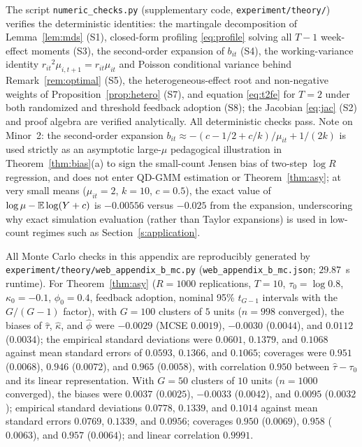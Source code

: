 The script \texttt{numeric\_checks.py} (supplementary code, \texttt{experiment/theory/}) verifies the
deterministic identities: the martingale decomposition of Lemma~\ref{lem:mds} (S1), closed-form profiling \eqref{eq:profile}
solving all $T-1$ week-effect moments (S3), the second-order expansion of $b_{it}$ (S4), the working-variance identity $r_{it}{}^2\mu_{i,t+1}=r_{it}\mu_{it}$
and Poisson conditional variance behind Remark~\ref{rem:optimal} (S5), the heterogeneous-effect root and non-negative weights of
Proposition~\ref{prop:hetero} (S7), and equation \eqref{eq:t2fe} for $T=2$ under both randomized and threshold feedback adoption (S8); the Jacobian
\eqref{eq:jac} (S2) and proof algebra are verified analytically. All deterministic checks pass. Note on Minor~2: the second-order
expansion $b_{it}\approx -(c-1/2+c/k)/\mu_{it}+1/(2k)$ is used strictly as an asymptotic large-$\mu$ pedagogical illustration in
Theorem~\ref{thm:bias}(a) to sign the small-count Jensen bias of two-step $\log R$ regression, and does not enter QD-GMM estimation or Theorem~\ref{thm:asy}; at very small means ($\mu_{it}=2$, $k=10$, $c=0.5$), the exact value of $\log\mu-\mathbb{E}\log(Y+c)$ is $-0.00556$ versus $-0.025$ from the expansion, underscoring why exact simulation evaluation (rather than Taylor expansions) is used in low-count regimes such as Section~\ref{s:application}.

All Monte Carlo checks in this appendix are reproducibly generated by \texttt{experiment/theory/web\_appendix\_b\_mc.py}
(\texttt{web\_appendix\_b\_mc.json}; $29.87$~s runtime). For Theorem~\ref{thm:asy} ($R=1000$ replications, $T=10$,
$\tau_0=\log0.8$, $\kappa_0=-0.1$, $\phi_0=0.4$, feedback adoption, nominal 95\% $t_{G-1}$
intervals with the $G/(G-1)$ factor), with $G=100$ clusters of $5$ units ($n=998$ converged), the biases of $\hat\tau$,
$\hat\kappa$, and $\hat\phi$ were $-0.0029$ (MCSE $0.0019$), $-0.0030$ ($0.0044$), and $0.0112$ ($0.0034$); the
empirical standard deviations were $0.0601$, $0.1379$, and $0.1068$ against mean standard errors of
$0.0593$, $0.1366$, and $0.1065$; coverages were $0.951$ ($0.0068$), $0.946$ ($0.0072$), and $0.965$ ($0.0058$),
with correlation $0.950$ between $\hat\tau-\tau_0$ and its linear representation. With $G=50$ clusters of $10$ units
($n=1000$ converged), the biases were $0.0037$ ($0.0025$), $-0.0033$ ($0.0042$), and $0.0095$ ($0.0032$); empirical
standard deviations $0.0778$, $0.1339$, and $0.1014$ against mean standard errors $0.0769$, $0.1339$, and $0.0956$;
coverages $0.950$ ($0.0069$), $0.958$ ($0.0063$), and $0.957$ ($0.0064$); and linear correlation $0.9991$.

